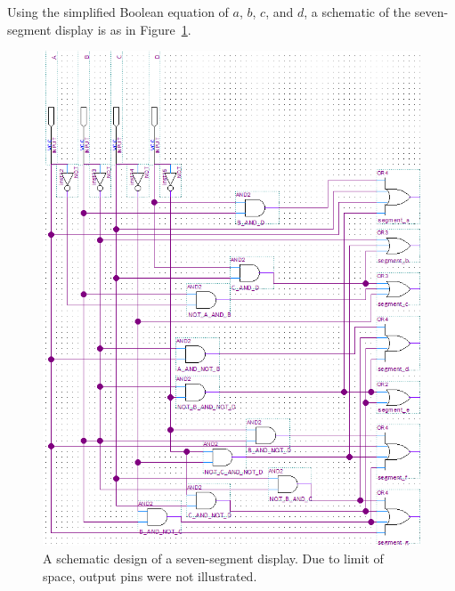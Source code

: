 \documentclass[12pt]{article}
\begin{document}
Using the simplified Boolean equation of $a$, $b$, $c$, and $d$, a schematic of the seven-segment display is as in Figure~\ref{figure:4}.

\begin{figure}
  \centering
  \includegraphics[width=\textwidth,height=\textheight,keepaspectratio]{seven_segment_display_schematic.png}
  \caption{A schematic design of a seven-segment display. Due to limit of space, output pins were not illustrated.}
  \label{figure:4}
\end{figure}
\end{document}
